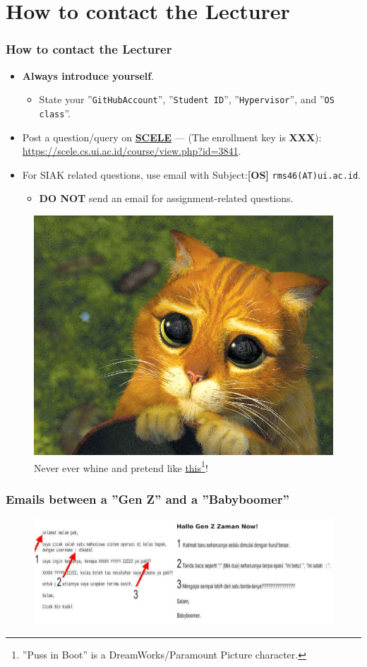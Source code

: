 \documentclass[aspectratio=169, xcolor=table, notheorems, hyperref={pdfpagelabels=false}]{beamer}
\begin{document}
\section{How to contact the Lecturer}
\begin{frame}[fragile]
\frametitle{How to contact the Lecturer}
\begin{itemize}
\item \textbf{Always introduce yourself}.
\begin{itemize}
\item State your ''\texttt{GitHubAccount}'', ''\texttt{Student ID}'', ''\texttt{Hypervisor}'', and ''\texttt{OS class}''.
\end{itemize}
\item Post a question/query on 
\href{https://scele.cs.ui.ac.id/course/view.php?id=3841}{\textbf{SCELE}} ---
(The enrollment key is \textbf{XXX}):
\href{https://scele.cs.ui.ac.id/course/view.php?id=3841}{https://scele.cs.ui.ac.id/course/view.php?id=3841}.
\item For SIAK related questions, use email with
Subject:\textbf{[OS]} \texttt{rms46(AT)ui.ac.id}. 
\begin{itemize}
\item \textbf{DO NOT} send an email for assignment-related questions.
\end{itemize}
\end{itemize}

\begin{figure}
\includegraphics[width=0.27\linewidth]{os00-pib}
\caption{Never ever whine and pretend like 
         \href{https://rahmatm.samik-ibrahim.vlsm.org/2013/12/puss-in-boots.html}{this}\footnote{''Puss in Boot'' is a DreamWorks/Paramount Picture character.}!}
\end{figure}
\end{frame}

\begin{frame}
\frametitle{Emails between a ''Gen Z'' and a ''Babyboomer''}
\begin{figure}
\includegraphics[width=1.01\linewidth]{os-millenial-mail}
\end{figure}
\end{frame}
\end{document}
